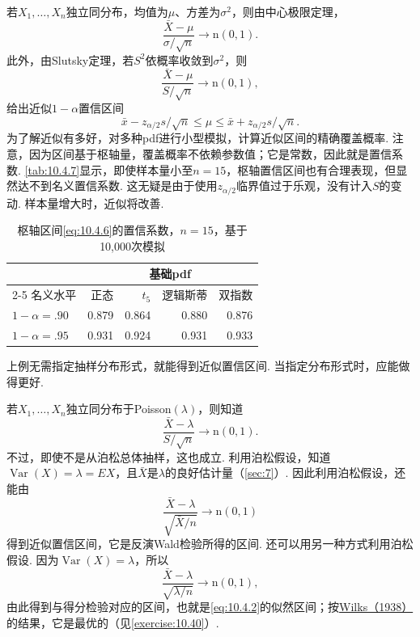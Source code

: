 \begin{example}[近似区间]\label{ex:10.4.4}
若$X_1,\ldots,X_n$独立同分布，均值为$\mu$、方差为$\sigma^2$，则由中心极限定理，
$$\frac{\bar X-\mu}{\sigma/\sqrt n}\longrightarrow\mathrm n(0,1).$$
此外，由Slutsky定理，若$S^2$依概率收敛到$\sigma^2$，则
$$\frac{\bar X-\mu}{S/\sqrt n}\longrightarrow\mathrm n(0,1),$$
给出近似$1-\alpha$置信区间
\begin{equation}\label{eq:10.4.6}
\bar x-z_{\alpha/2}s/\sqrt n\leq\mu\leq\bar x+z_{\alpha/2}s/\sqrt n.
\end{equation}
为了解近似有多好，对多种pdf进行小型模拟，计算近似区间的精确覆盖概率. 注意，因为区间基于枢轴量，覆盖概率不依赖参数值；它是常数，因此就是置信系数. \autoref{tab:10.4.7}显示，即使样本量小至$n=15$，枢轴置信区间也有合理表现，但显然达不到名义置信系数. 这无疑是由于使用$z_{\alpha/2}$临界值过于乐观，没有计入$S$的变动. 样本量增大时，近似将改善.

\par\begin{table}[htbp]\centering\setcounter{table}{6}
\caption{枢轴区间\eqref{eq:10.4.6}的置信系数，$n=15$，基于10,000次模拟}\label{tab:10.4.7}
\begin{tabular}{l|rrrr}\toprule
&\multicolumn{4}{c}{基础pdf}\\\cmidrule(lr){2-5}
名义水平&正态&$t_5$&逻辑斯蒂&双指数\\\midrule
$1-\alpha=.90$&0.879&0.864&0.880&0.876\\
$1-\alpha=.95$&0.931&0.924&0.931&0.933\\\bottomrule
\end{tabular}
\end{table}\par
\end{example}

上例无需指定抽样分布形式，就能得到近似置信区间. 当指定分布形式时，应能做得更好.

\begin{example}[近似泊松区间]\label{ex:10.4.5}
若$X_1,\ldots,X_n$独立同分布于Poisson$(\lambda)$，则知道
$$\frac{\bar X-\lambda}{S/\sqrt n}\longrightarrow\mathrm n(0,1).$$
不过，即使不是从泊松总体抽样，这也成立. 利用泊松假设，知道$\operatorname{Var}(X)=\lambda=EX$，且$\bar X$是$\lambda$的良好估计量（\autoref{sec:7}）. 因此利用泊松假设，还能由
$$\frac{\bar X-\lambda}{\sqrt{\bar X/n}}\longrightarrow\mathrm n(0,1)$$
得到近似置信区间，它是反演Wald检验所得的区间. 还可以用另一种方式利用泊松假设. 因为$\operatorname{Var}(X)=\lambda$，所以
$$\frac{\bar X-\lambda}{\sqrt{\lambda/n}}\longrightarrow\mathrm n(0,1),$$
由此得到与得分检验对应的区间，也就是\eqref{eq:10.4.2}的似然区间；按\hyperref[bib:source330]{Wilks（1938）}的结果，它是最优的（见\autoref{exercise:10.40}）.
\end{example}

